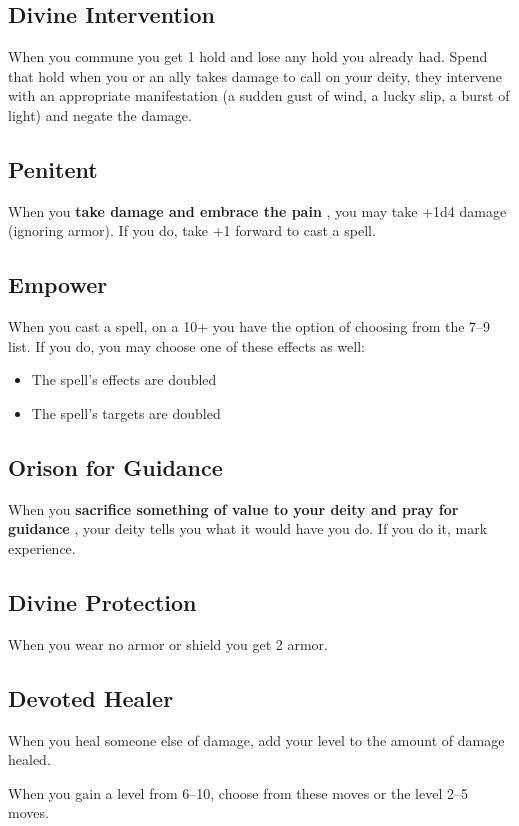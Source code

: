 \subsection{Divine Intervention}


 When you commune you get 1 hold and lose any hold you already had. Spend that hold when you or an ally takes damage to call on your deity, they intervene with an appropriate manifestation (a sudden gust of wind, a lucky slip, a burst of light) and negate the damage.
\subsection{Penitent}


 When you \textbf{take damage and embrace the pain}
, you may take +1d4 damage (ignoring armor). If you do, take +1 forward to cast a spell.
\subsection{Empower}


 When you cast a spell, on a 10+ you have the option of choosing from the 7--9 list. If you do, you may choose one of these effects as well:
\begin{itemize}
\item The spell's effects are doubled
\item The spell's targets are doubled

\end{itemize}
\subsection{Orison for Guidance}


 When you \textbf{sacrifice something of value to your deity and pray for guidance}
, your deity tells you what it would have you do. If you do it, mark experience.
\subsection{Divine Protection}


 When you wear no armor or shield you get 2 armor.
\subsection{Devoted Healer}


 When you heal someone else of damage, add your level to the amount of damage healed.


\vspace{\baselineskip}
 {\Large When you gain a level from 6--10, choose from these moves or the level 2--5 moves.}
